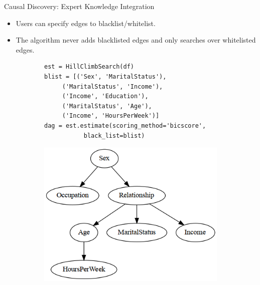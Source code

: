 \documentclass[aspectratio=169]{beamer}
\begin{document}
\begin{frame}[fragile]{Causal Discovery: Expert Knowledge Integration}
	\begin{itemize}
		\item Users can specify edges to blacklist/whitelist.
		\item The algorithm never adds blacklisted edges and only
			searches over whitelisted edges.
	\end{itemize}
	\vfill
	\begin{figure}
		\begin{subfigure}{0.6 \textwidth}
			\begin{verbatim}
est = HillClimbSearch(df)
blist = [('Sex', 'MaritalStatus'),
	 ('MaritalStatus', 'Income'),
	 ('Income', 'Education'),
	 ('MaritalStatus', 'Age'),
	 ('Income', 'HoursPerWeek')]
dag = est.estimate(scoring_method='bicscore',
		   black_list=blist)
			\end{verbatim}
		\end{subfigure}%
		\begin{subfigure}{0.4 \textwidth}
			\centering
			\includegraphics[scale=0.3]{imgs/adult_bic_blacklist.png}
		\end{subfigure}
	\end{figure}
\end{frame}
\end{document}
